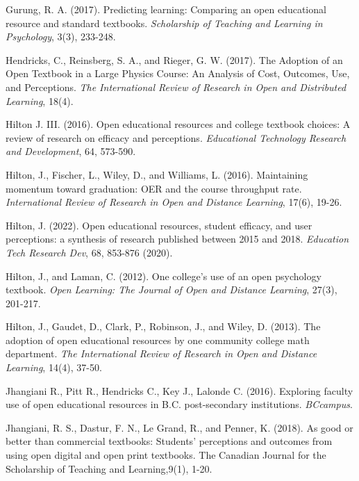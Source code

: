 \documentclass[11pt]{article}
\newcommand{\alink}[2]{\href{#1}{\textcolor{blue}{#2}}}
\begin{document}
\begin{thebibliography}{99}
   Gurung, R. A. (2017). Predicting learning: Comparing an open educational resource and standard textbooks. {\em Scholarship of Teaching and Learning in Psychology}, 3(3), 233-248.

   Hendricks, C., Reinsberg, S. A., and Rieger, G. W. (2017). The Adoption of an Open Textbook in a Large Physics Course: An Analysis of Cost, Outcomes, Use, and Perceptions. {\em The International Review of Research in Open and Distributed Learning}, 18(4).

   Hilton J. III. (2016). Open educational resources and college textbook choices: A review of research on efficacy and perceptions. {\em Educational Technology Research and Development}, 64, 573-590.

   Hilton, J., Fischer, L., Wiley, D., and Williams, L. (2016). Maintaining momentum toward graduation: OER and the course throughput rate. {\em International Review of Research in Open and Distance Learning}, 17(6), 19-26.

   Hilton, J. (2022). Open educational resources, student efficacy, and user perceptions: a synthesis of research published between 2015 and 2018. {\em Education Tech Research Dev}, 68, 853-876 (2020).%

   Hilton, J., and Laman, C. (2012). One college’s use of an open psychology textbook. {\em Open Learning: The Journal of Open and Distance Learning}, 27(3), 201-217.

   Hilton, J., Gaudet, D., Clark, P., Robinson, J., and Wiley, D. (2013). The adoption of open educational resources by one community college math department. {\em The International Review of Research in Open and Distance Learning}, 14(4), 37-50.

   Jhangiani R., Pitt R., Hendricks C., Key J., Lalonde C. (2016). Exploring faculty use of open educational resources in B.C. post-secondary institutions. {\em BCcampus}. %

   Jhangiani, R. S., Dastur, F. N., Le Grand, R., and Penner, K. (2018). As good or better than commercial textbooks: Students' perceptions and outcomes from using open digital and open print textbooks. The Canadian Journal for the Scholarship of Teaching and Learning,9(1), 1-20.


\end{thebibliography}
\end{document}
